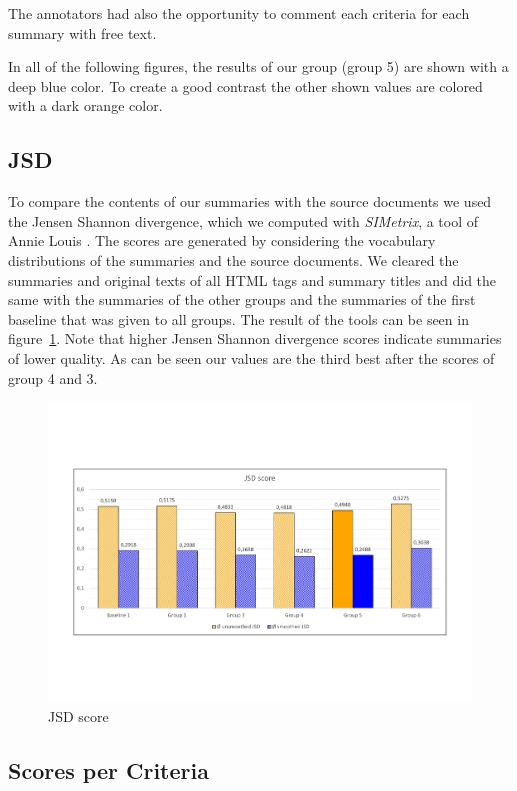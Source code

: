 The annotators had also the opportunity to comment each criteria for each summary with free text.

In all of the following figures, the results of our group (group 5) are shown with a deep blue color. To create a good contrast the other shown values are colored with a dark orange color.

\subsection{JSD}
To compare the contents of our summaries with the source documents we used the
Jensen Shannon divergence, which we computed with \textit{SIMetrix}, a tool of
Annie Louis \citep{louis}. The scores are generated by considering the vocabulary
distributions of the summaries and the source documents. We cleared the summaries
and original texts of all HTML tags and summary titles and did the same
with the summaries of the other groups and the summaries of the first baseline
that was given to all groups. The result of the tools can be seen in
figure~\ref{fig:jsd}. Note that higher Jensen Shannon divergence scores indicate
summaries of lower quality. As can be seen our values are the third best after
the scores of group 4 and 3.
\begin{figure}[H]
	\centering
	\includegraphics[trim=0 150 0 150, width=\textwidth]{img/jsd.pdf}
	\caption{JSD score}
	\label{fig:jsd}
\end{figure}


\subsection{Scores per Criteria}

